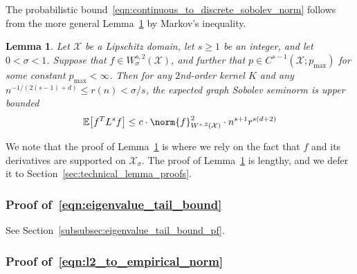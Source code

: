 \documentclass{article}
\newcommand{\1}{\mathbf{1}}
\newcommand{\Xset}{\mathcal{X}}
\newcommand{\Ebb}{\mathbb{E}}
\theoremstyle{alden}
\theoremstyle{aldenthm}
\newtheorem{lemma}{Lemma}
\theoremstyle{definition}
\theoremstyle{remark}
\begin{document}
The probabilistic bound~\eqref{eqn:continuous_to_discrete_sobolev_norm} follows from the more general Lemma~\ref{lem:roughness_functional_expectation_sobolev} by Markov's inequality. 
\begin{lemma}
	\label{lem:roughness_functional_expectation_sobolev}
	Let $\Xset$ be a Lipschitz domain, let $s \geq 1$ be an integer, and let $0 < \sigma < 1$. Suppose that $f \in W_{\sigma}^{s,2}(\Xset)$, and further that $p \in C^{s-1}(\Xset;p_{\max})$ for some constant $p_{\max} < \infty$. Then for any $2$nd-order kernel $K$ and any $n^{-1/(2(s - 1) + d)} \leq r(n) < \sigma/s$, the expected graph Sobolev seminorm is upper bounded
	\begin{equation}
	\label{eqn:roughness_functional_expectation_sobolev}
	\Ebb\bigl[f^T L^s f\bigr] \leq c \cdot \norm{f}_{W^{s,2}(\Xset)}^2 \cdot n^{s + 1}r^{s(d + 2)}
	\end{equation}
\end{lemma}

We note that the proof of Lemma~\ref{lem:roughness_functional_expectation_sobolev} is where we rely on the fact that $f$ and its derivatives are supported on $\Xset_{\sigma}$. The proof of Lemma~\ref{lem:roughness_functional_expectation_sobolev} is lengthy, and we defer it to Section~\ref{sec:technical_lemma_proofs}.

\subsubsection{Proof of~\eqref{eqn:eigenvalue_tail_bound}}
See Section~\ref{subsubsec:eigenvalue_tail_bound_pf}.

\subsubsection{Proof of~\eqref{eqn:l2_to_empirical_norm}}
\end{document}
